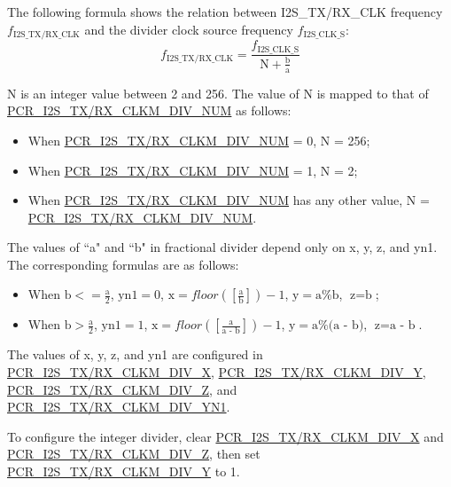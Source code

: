 \documentclass[main\_\_EN.tex]{subfiles}
\begin{document}
The following formula shows the relation between I2S\_TX/RX\_CLK frequency $f_{\textrm{I2S\_TX/RX\_CLK}}$ and the divider clock source frequency $f_{\textrm{I2S\_CLK\_S}}$:
$$f_{\textrm{I2S\_TX/RX\_CLK}}=\frac{f_{\textrm{I2S\_CLK\_S}}}{\textrm{N} + \frac{\textrm{b}}{\textrm{a}}}$$

N is an integer value between 2 and 256. The value of N is mapped to that of \hyperref[fielddesc:PCRI2STXCLKMDIVNUM]{PCR\_I2S\_TX/RX\_CLKM\_DIV\_NUM} as follows:

\begin{itemize}
    \item When \hyperref[fielddesc:PCRI2STXCLKMDIVNUM]{PCR\_I2S\_TX/RX\_CLKM\_DIV\_NUM} = 0, N = 256;
    \item When \hyperref[fielddesc:PCRI2STXCLKMDIVNUM]{PCR\_I2S\_TX/RX\_CLKM\_DIV\_NUM} = 1, N = 2;
    \item When \hyperref[fielddesc:PCRI2STXCLKMDIVNUM]{PCR\_I2S\_TX/RX\_CLKM\_DIV\_NUM} has any other value, N =  \hyperref[fielddesc:PCRI2STXCLKMDIVNUM]{PCR\_I2S\_TX/RX\_CLKM\_DIV\_NUM}.
\end{itemize}

The values of ``a" and ``b" in fractional divider depend only on x, y, z, and yn1. The corresponding formulas are as follows:

\begin{itemize}
    \item When $\textrm{b} <= \frac{\textrm{a}}{2}$, $\textrm{yn1} = 0$, $\textrm{x} = floor([\frac{\textrm{a}}{\textrm{b}}]) - 1$, $\textrm{y} = \textrm{a}\%\textrm{b}$, $\textrm{z} = \textrm{b}$; 
    \item When $\textrm{b} > \frac{\textrm{a}}{2}$, $\textrm{yn1}=1$, $\textrm{x} = floor([\frac{\textrm{a}}{\textrm{a - b}}]) - 1$, $\textrm{y} = \textrm{a}\%\textrm{(a - b)}$, $\textrm{z}=\textrm{a - b}$.
\end{itemize}

The values of x, y, z, and yn1 are configured in \hyperref[fielddesc:PCRI2STXCLKMDIVX]{PCR\_I2S\_TX/RX\_CLKM\_DIV\_X}, \hyperref[fielddesc:PCRI2STXCLKMDIVY]{PCR\_I2S\_TX/RX\_CLKM\_DIV\_Y}, \hyperref[fielddesc:PCRI2STXCLKMDIVZ]{PCR\_I2S\_TX/RX\_CLKM\_DIV\_Z}, and \hyperref[fielddesc:PCRI2STXCLKMDIVYN1]{PCR\_I2S\_TX/RX\_CLKM\_DIV\_YN1}.

To configure the integer divider, clear \hyperref[fielddesc:PCRI2STXCLKMDIVX]{PCR\_I2S\_TX/RX\_CLKM\_DIV\_X} and \hyperref[fielddesc:PCRI2STXCLKMDIVZ]{PCR\_I2S\_TX/RX\_CLKM\_DIV\_Z}, then set \hyperref[fielddesc:PCRI2STXCLKMDIVY]{PCR\_I2S\_TX/RX\_CLKM\_DIV\_Y} to 1.
\end{document}
